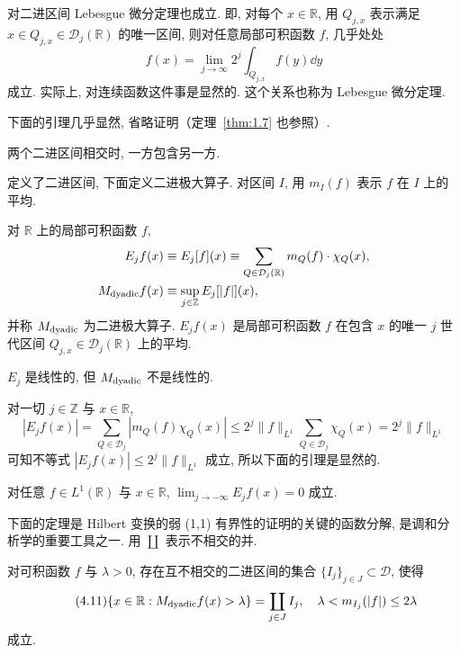 对二进区间 Lebesgue 微分定理也成立. 即, 对每个 $x \in \mathbb{R}$, 用 $Q_{j,x}$ 表示满足 $x \in Q_{j,x} \in \mathcal{D}_{j}(\mathbb{R})$ 的唯一区间, 则对任意局部可积函数 $f$, 几乎处处
\[
f(x) = \lim_{j \to \infty}2^{j}\int_{Q_{j,x}}f(y)\dd y
\]
成立. 实际上, 对连续函数这件事是显然的. 这个关系也称为 Lebesgue 微分定理.

下面的引理几乎显然, 省略证明（定理~\ref{thm:1.7} 也参照）.

\begin{lemma}[二进区间的嵌套结构]\label{lem:4.1}
两个二进区间相交时, 一方包含另一方.
\end{lemma}

定义了二进区间, 下面定义二进极大算子. 对区间 $I$, 用 $m_{I}(f)$ 表示 $f$ 在 $I$ 上的平均.

\begin{definition}[二进极大算子]\label{def:4.2}
对 $\mathbb{R}$ 上的局部可积函数 $f$,
\begin{align*}
E_{j}f(x) &\equiv E_{j}[f](x) \equiv \sum_{Q \in \mathcal{D}_{j}(\mathbb{R})}m_{Q}(f) \cdot \chi_{Q}(x), \\
M_{\mathrm{dyadic}}f(x) &\equiv \sup_{j \in \mathbb{Z}}E_{j}[|f|](x),
\end{align*}
并称 $M_{\mathrm{dyadic}}$ 为二进极大算子. $E_{j}f(x)$ 是局部可积函数 $f$ 在包含 $x$ 的唯一 $j$ 世代区间 $Q_{j,x} \in \mathcal{D}_{j}(\mathbb{R})$ 上的平均.
\end{definition}

$E_{j}$ 是线性的, 但 $M_{\mathrm{dyadic}}$ 不是线性的.

对一切 $j \in \mathbb{Z}$ 与 $x \in \mathbb{R}$,
\[
|E_{j}f(x)| = \sum_{Q \in \mathcal{D}_{j}}|m_{Q}(f)\chi_{Q}(x)| \leq 2^{j}\|f\|_{L^{1}}\sum_{Q \in \mathcal{D}_{j}}\chi_{Q}(x) = 2^{j}\|f\|_{L^{1}}
\]
可知不等式 $|E_{j}f(x)| \leq 2^{j}\|f\|_{L^{1}}$ 成立, 所以下面的引理是显然的.

\begin{lemma}\label{lem:4.2}
对任意 $f \in L^{1}(\mathbb{R})$ 与 $x \in \mathbb{R}$, $\lim_{j \to -\infty}E_{j}f(x) = 0$ 成立.
\end{lemma}

下面的定理是 Hilbert 变换的弱 (1,1) 有界性的证明的关键的函数分解, 是调和分析学的重要工具之一. 用 $\coprod$ 表示不相交的并.

\begin{theorem}\label{thm:4.2}
对可积函数 $f$ 与 $\lambda > 0$, 存在互不相交的二进区间的集合 $\{I_{j}\}_{j \in J} \subset \mathcal{D}$, 使得
\begin{equation}\tag{4.11}
\{x \in \mathbb{R} : M_{\mathrm{dyadic}}f(x) > \lambda\} = \coprod_{j \in J}I_{j}, \quad \lambda < m_{I_{j}}(|f|) \leq 2\lambda
\label{eq:4.11}
\end{equation}
成立.
\end{theorem}

